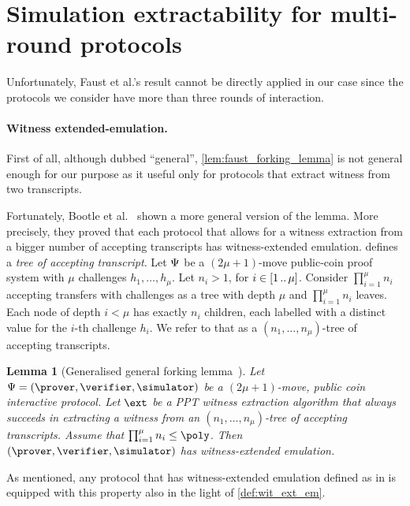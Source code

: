 \documentclass[runningheads]{llncs}
\newtheorem{lemma}[theorem]{Lemma}
\theoremstyle{definition}
\begin{document}


% 
\section{Simulation extractability for multi-round protocols}
Unfortunately, Faust et al.'s result cannot be directly applied in our case since the protocols we consider have more than three rounds of interaction.

\paragraph{Witness extended-emulation.}
First of all, although dubbed ``general'', \cref{lem:faust_forking_lemma} is not general enough for our purpose as it useful only for protocols that extract witness from two transcripts.

Fortunately, Bootle et al.~\cite{EC:BCCGP16} shown a more general version of the lemma. More precisely, they proved that each protocol that allows for a witness extraction from a bigger number of accepting transcripts has witness-extended emulation. \cite{EC:BCCGP16} defines a \emph{tree of accepting transcript}. 
Let $\mathrm{\Psi}$ be a $(2 \mu + 1)$-move public-coin proof system with $\mu$ challenges $h_1, \ldots, h_\mu$. Let $n_i > 1$, for $i \in [1 \, .. \, \mu]$.
Consider $\prod_{i = 1}^{\mu} n_i$ accepting transfers with challenges as a tree with depth $\mu$ and $\prod_{i = 1}^{\mu} n_i$ leaves.	Each node of depth $i < \mu$ has exactly $n_i$ children, each labelled with a distinct value for the $i$-th challenge $h_i$. We refer to that as a $(n_1, \ldots, n_\mu)$-tree of accepting transcripts.

\begin{lemma}[Generalised general forking lemma~\cite{EC:BCCGP16}]
	\label{lem:bootle_forking_lemma}
	Let $\proofsystem = (\prover, \verifier, \simulator)$ be a $(2\mu + 1)$-move, public coin interactive  protocol. Let $\ext$ be a PPT witness extraction algorithm that always succeeds in extracting a witness from an $(n_1, \ldots, n_\mu)$-tree of accepting transcripts. Assume that $\prod_{i = 1}^{\mu} n_i \leq \poly$. 
	Then $(\prover, \verifier, \simulator)$ has witness-extended emulation.
\end{lemma}
As mentioned, any protocol that has witness-extended emulation defined as in \cite{EC:BCCGP16} is equipped with this property also in the light of \cref{def:wit_ext_em}.
\end{document}
